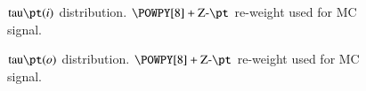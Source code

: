 \begin{figure}[h!tbp]
	\centering
	\hfill
	\caption{$\text{tau}\pt(i)$ distribution. $\POWPY[8]+\text{Z-}\pt$ re-weight used for MC signal.}
	\label{AFig5P}
\end{figure} 

\begin{figure}[h!tbp]
	\centering
	\hfill
	\caption{$\text{tau}\pt(o)$ distribution. $\POWPY[8]+\text{Z-}\pt$ re-weight used for MC signal.}
	\label{AFig6S}
\end{figure} 

